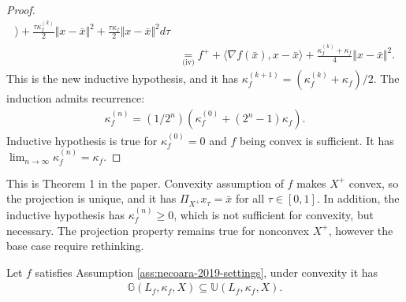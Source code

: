 \documentclass[12pt]{report}
\begin{document}
\begin{proof}
{\begin{align*}
                        \rangle
                        + \frac{\tau\kappa_f^{(k)}}{2} \Vert x - \bar x\Vert^2
                        + \frac{\tau\kappa_f}{2}\Vert x - \bar x\Vert^2
                    d\tau
                    \\
                    &\underset{\text{(iv)}}{=} 
                    f^+ + 
                    \langle 
                        \nabla f(\bar x), x - \bar x
                    \rangle
                    +
                    \frac{\kappa^{(k)}_f + \kappa_f}{4}
                    \Vert x - \bar x\Vert^2. 
                \end{align*}
                }
                This is the new inductive hypothesis, and it has $\kappa_f^{(k + 1)} = (\kappa_f^{(k)} + \kappa_f)/2$. 
                The induction admits recurrence: 
                \begin{align*}
                    \kappa_f^{(n)} = (1/2^n)(\kappa_f^{(0)} + (2^n - 1)\kappa_f). 
                \end{align*}
                Inductive hypothesis is true for $\kappa_f^{(0)} = 0$ and $f$ being convex is sufficient. 
                It has $\lim_{n\rightarrow \infty} \kappa_f^{(n)} = \kappa_f$. 
            \end{proof}
            \begin{remark}
                This is Theorem 1 in the paper. 
                Convexity assumption of $f$ makes $X^+$ convex, so the projection is unique, and it has $\Pi_{X^+}x_\tau = \bar x$ for all $\tau \in [0, 1]$. 
                In addition, the inductive hypothesis has $\kappa_f^{(n)} \ge 0$, which is not sufficient for convexity, but necessary. 
                The projection property remains true for nonconvex $X^+$, however the base case require rethinking. 
            \end{remark}
            \begin{theorem}\label{thm:qgg-implies-qua}
                Let $f$ satisfies Assumption \ref{ass:necoara-2019-settings}, under convexity it has 
                \begin{align*}
                    \mathbb G(L_f, \kappa_f, X)\subseteq \mathbb U(L_f, \kappa_f, X). 
                \end{align*}
            \end{theorem}
\end{document}
